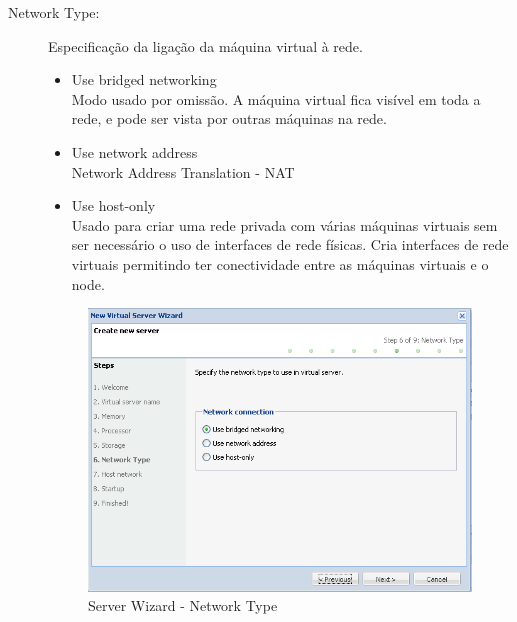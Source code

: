 \begin{description}
        \item[Network Type:] Especificação da ligação da máquina virtual à rede.
		\begin{itemize}
			\item Use bridged networking\\
			Modo usado por omissão. A máquina virtual fica visível em toda a rede, e pode ser vista por outras máquinas na rede.
			\item Use network address\\
			Network Address Translation - NAT
			\item Use host-only\\
			Usado para criar uma rede privada com várias máquinas virtuais sem ser necessário o uso de interfaces de rede físicas. Cria interfaces de rede virtuais permitindo ter conectividade entre as  máquinas virtuais e o node.
		\end{itemize}
		
		\begin{figure}[H]
        		\begin{center}
	        	\includegraphics[scale=0.5]{screenshots/server_createwiz_nettype.png}
	        	\caption{Server Wizard - Network Type}
		        \label{fig:server_createwiz_nettype}
        		\end{center}
		\end{figure}
        

\end{description}
